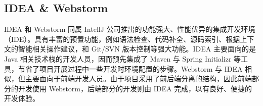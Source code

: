 \subsection{IDEA \& Webstorm}
IDEA 和 Webstorm 同属 IntellJ 公司推出的功能强大、性能优异的集成开发环境（IDE）。具有丰富的预置功能，例如语法检查、代码补全、源码索引、根据上下文的智能相关操作建议，和 Git/SVN 版本控制等强大功能。IDEA 主要面向的是 Java 相关技术栈的开发人员，因而预先集成了 Maven 与 Spring Initializr 等工具，节省了项目开展过程中一些开发时环境配置的步骤。Webstorm 与 IDEA 相似，但主要面向于前端开发人员。由于项目采用了前后端分离的结构，因此前端部分的开发使用 Webstorm，后端部分的开发则由 IDEA 完成，以有良好、便捷的开发体验。